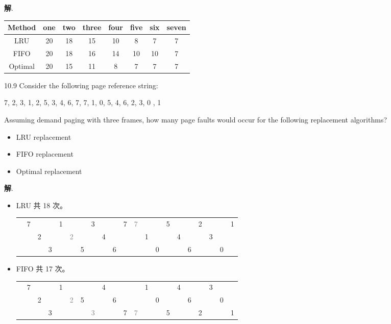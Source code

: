 \documentclass[12pt,a4paper]{article}
\newenvironment{problems}{\begin{list}{}{\renewcommand{\makelabel}[1]{\textbf{##1}\hfil}}}{\end{list}}
\providecommand{\sol}{\textbf{解}.~}
\begin{document}
\begin{problems}
    \sol 

    \begin{tabular}{c|ccccccc}
        \hline
        Method & one & two & three & four & five & six & seven \\
        \hline
        LRU     & 20 & 18 & 15 & 10 & 8  & 7  & 7 \\
        FIFO    & 20 & 18 & 16 & 14 & 10 & 10 & 7 \\
        Optimal & 20 & 15 & 11 & 8  & 7  & 7  & 7 \\
        \hline
    \end{tabular}

    \item[10.9]  Consider the following page reference string:
    \begin{center}
        7, 2, 3, 1, 2, 5, 3, 4, 6, 7, 7, 1, 0, 5, 4, 6, 2, 3, 0 , 1
    \end{center} 
    Assuming demand paging with three frames, how many page faults would occur for the following replacement algorithms?
    \begin{itemize}
        \item LRU replacement
        \item FIFO replacement
        \item Optimal replacement
    \end{itemize}

    \sol \begin{itemize}
        \item LRU 共 18 次。
        
        \begin{tabular}{c|cccccccccccccccccccc}
            &7& & &1& & &3& & &7&\textcolor{gray}{7}& & &5& & &2& & &1\\
            & &2& & &\textcolor{gray}{2}& & &4& & & &1& & &4& & &3& & \\
            & & &3& & &5& & &6& & & &0& & &6& & &0& 
        \end{tabular}
        \item FIFO 共 17 次。
        
        \begin{tabular}{c|cccccccccccccccccccc}
            &7& & &1& & & &4& & & &1& & &4& & &3& & \\
            & &2& & &\textcolor{gray}{2}&5& & &6& & & &0& & &6& & &0& \\
            & & &3& & & &\textcolor{gray}{3}& & &7&\textcolor{gray}{7}& & &5& & &2& & &1 
        \end{tabular}


\end{itemize}
\end{problems}
\end{document}
